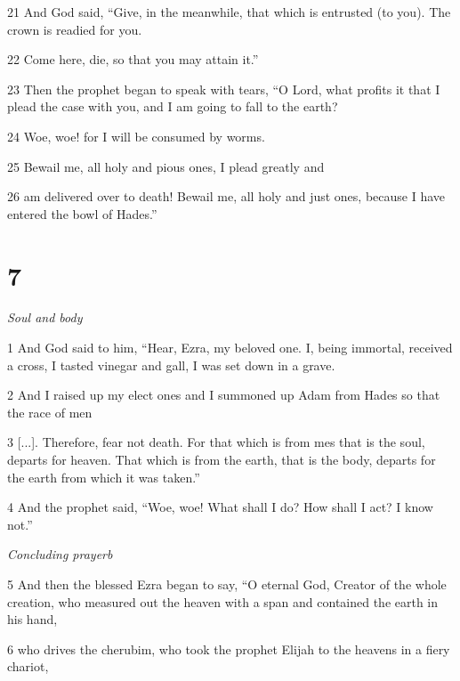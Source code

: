 \par 21 And God said, “Give, in the meanwhile, that which is entrusted (to you). The crown is readied for you.

\par 22 Come here, die, so that you may attain it.”

\par 23 Then the prophet began to speak with tears, “O Lord, what profits it that I plead the case with you, and I am going to fall to the earth?

\par 24 Woe, woe! for I will be consumed by worms.

\par 25 Bewail me, all holy and pious ones, I plead greatly and

\par 26 am delivered over to death! Bewail me, all holy and just ones, because I have entered the bowl of Hades.”

\chapter{7}

\par \textit{Soul and body}

\par 1 And God said to him, “Hear, Ezra, my beloved one. I, being immortal, received a cross, I tasted vinegar and gall, I was set down in a grave.

\par 2 And I raised up my elect ones and I summoned up Adam from Hades so that the race of men

\par 3 [...]. Therefore, fear not death. For that which is from mes that is the soul, departs for heaven. That which is from the earth, that is the body, departs for the earth from which it was taken.”

\par 4 And the prophet said, “Woe, woe! What shall I do? How shall I act? I know not.”

\par \textit{Concluding prayerb}

\par 5 And then the blessed Ezra began to say, “O eternal God, Creator of the whole creation, who measured out the heaven with a span and contained the earth in his hand,

\par 6 who drives the cherubim, who took the prophet Elijah to the heavens in a fiery chariot,

